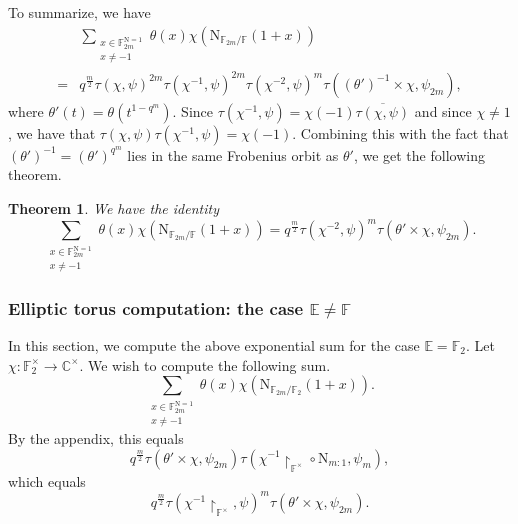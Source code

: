 \documentclass[12pt, reqno]{amsart}
\newtheorem{theorem}{Theorem}[section]
\theoremstyle{definition}
\theoremstyle{definition}
\theoremstyle{definition}
\newcommand{\cComplex}{\mathbb{C}}
\newcommand{\multiplicativegroup}[1]{#1^{\times}}
\newcommand{\conjugate}[1]{\overline{#1}}
\newcommand{\fieldCharacter}{\psi}
\newcommand{\FieldNorm}[2]{\mathrm{N}_{#1:#2}}
\newcommand{\aFieldNorm}{\mathrm{N}}
\newcommand{\finiteField}{\mathbb{F}}
\newcommand{\quadraticExtension}{\mathbb{E}}
\newcommand{\finiteFieldExtension}[1]{\finiteField_{#1}}
\newcommand{\NormOneGroup}[1]{\finiteFieldExtension{#1}^{\aFieldNorm = 1}}
\newcommand{\GaussSumSingleCharacter}[2]{\tau\left(#1, #2\right)}
\newcommand{\GaussSumCharacter}[3]{\tau\left(#1 \times #2, #3\right)}
\begin{document}
To summarize, we have
\begin{align*}
	& \sum_{\substack{x \in \NormOneGroup{2m}\\
			x \ne -1}} \theta \left(x\right) \chi\left(\aFieldNorm_{\finiteFieldExtension{2m} \slash \finiteField}\left(1 + x\right)\right) \\
		=& q^{\frac{m}{2}} \GaussSumSingleCharacter{\chi}{\fieldCharacter}^{2m} \GaussSumSingleCharacter{\chi^{-1}}{\fieldCharacter}^{2m} \GaussSumSingleCharacter{\chi^{-2}}{\fieldCharacter}^m \GaussSumCharacter{\left(\theta'\right)^{-1}}{\chi}{\fieldCharacter_{2m}},
\end{align*}
where $\theta'\left(t\right) = \theta\left(t^{1-q^m}\right)$.
Since $\tau\left(\chi^{-1}, \fieldCharacter\right) = \chi\left(-1\right) \conjugate{\tau\left(\chi, \fieldCharacter\right)}$ and since $\chi \ne 1$, we have that $\tau\left(\chi, \fieldCharacter\right) \tau\left(\chi^{-1}, \fieldCharacter\right) = \chi\left(-1\right)$. Combining this with the fact that $\left(\theta'\right)^{-1} = \left(\theta'\right)^{q^m}$ lies in the same Frobenius orbit as $\theta'$, we get the following theorem.
\begin{theorem}
	We have the identity $$\sum_{\substack{x \in \NormOneGroup{2m}\\
			x \ne -1}} \theta \left(x\right) \chi\left(\aFieldNorm_{\finiteFieldExtension{2m} \slash \finiteField}\left(1 + x\right)\right) = q^{\frac{m}{2}} \GaussSumSingleCharacter{\chi^{-2}}{\fieldCharacter}^m \GaussSumCharacter{\theta'}{\chi}{\fieldCharacter_{2m}}.$$
\end{theorem}

\subsubsection{Elliptic torus computation: the case $\quadraticExtension \ne \finiteField$}
In this section, we compute the above exponential sum for the case $\quadraticExtension = \finiteFieldExtension{2}$. Let $\chi \colon \multiplicativegroup{\finiteFieldExtension{2}} \to \multiplicativegroup{\cComplex}$. We wish to compute the following sum.
$$\sum_{\substack{x \in \NormOneGroup{2m}\\
		x \ne -1}} \theta \left(x\right) \chi\left(\aFieldNorm_{\finiteFieldExtension{2m} \slash \finiteFieldExtension{2}}\left(1 + x\right)\right).$$
By the appendix, this equals
$$q^{\frac{m}{2}} \GaussSumCharacter{\theta'}{\chi}{\fieldCharacter_{2m}} \tau\left(\chi^{-1} \restriction_{\multiplicativegroup{\finiteField}} \circ \FieldNorm{m}{1}, \fieldCharacter_m\right),$$
which equals
$$q^{\frac{m}{2}} \tau\left(\chi^{-1} \restriction_{\multiplicativegroup{\finiteField}}, \fieldCharacter\right)^m \GaussSumCharacter{\theta'}{\chi}{\fieldCharacter_{2m}}.$$
\end{document}
